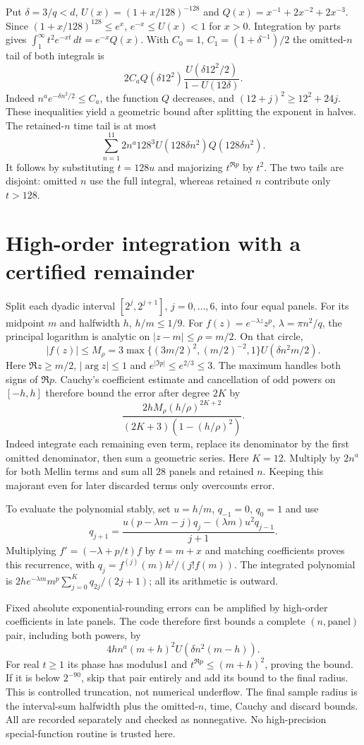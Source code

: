 Put $\delta=3/q<d$, $U(x)=(1+x/128)^{-128}$ and
$Q(x)=x^{-1}+2x^{-2}+2x^{-3}$. Since $(1+x/128)^{128}\le e^x$,
$e^{-x}\le U(x)<1$ for $x>0$. Integration by parts gives
$\int_1^\infty t^2e^{-xt}\,dt=e^{-x}Q(x)$.
With $C_0=1$, $C_1=(1+\delta^{-1})/2$ the omitted-$n$ tail of both integrals is
\[
 2C_aQ(\delta12^2)
 \frac{U(\delta12^2/2)}{1-U(12\delta)}.
\]
Indeed $n^ae^{-\delta n^2/2}\le C_a$, the function $Q$ decreases, and
$(12+j)^2\ge12^2+24j$. These inequalities yield a geometric bound after
splitting the exponent in halves. The retained-$n$ time tail is at most
\[
 \sum_{n=1}^{11}2n^a128^3U(128\delta n^2)Q(128\delta n^2).
\]
It follows by substituting $t=128u$ and majorizing $t^{\Re p}$ by $t^2$.
The two tails are disjoint: omitted $n$ use the full integral, whereas
retained $n$ contribute only $t>128$.

\section{High-order integration with a certified remainder}
Split each dyadic interval $[2^j,2^{j+1}]$, $j=0,\ldots,6$, into four equal
panels. For its midpoint $m$ and halfwidth $h$, $h/m\le1/9$.
For $f(z)=e^{-\lambda z}z^p$, $\lambda=\pi n^2/q$, the principal logarithm
is analytic on $|z-m|\le\rho=m/2$. On that circle,
\[
 |f(z)|\le M_\rho=3\max\{(3m/2)^2,(m/2)^{-2},1\}
 U(\delta n^2m/2).
\]
Here $\Re z\ge m/2$, $|\arg z|\le1$ and
$e^{|\Im p|}\le e^{2/3}\le3$. The maximum handles both signs of $\Re p$.
Cauchy's coefficient estimate and cancellation of odd powers on $[-h,h]$
therefore bound the error after degree $2K$ by
\[
 \frac{2hM_\rho(h/\rho)^{2K+2}}
 {(2K+3)(1-(h/\rho)^2)}.
\]
Indeed integrate each remaining even term, replace its denominator by the
first omitted denominator, then sum a geometric series. Here $K=12$.
Multiply by $2n^a$ for both Mellin terms and sum all $28$ panels and retained $n$.
Keeping this majorant even for later discarded terms only overcounts error.

To evaluate the polynomial stably, set $u=h/m$, $q_{-1}=0$, $q_0=1$ and use
\[
 q_{j+1}=\frac{u(p-\lambda m-j)q_j-(\lambda m)u^2q_{j-1}}{j+1}.
\]
Multiplying $f'=(-\lambda+p/t)f$ by $t=m+x$ and matching coefficients proves
this recurrence, with $q_j=f^{(j)}(m)h^j/(j!f(m))$. The integrated polynomial is
$2he^{-\lambda m}m^p\sum_{j=0}^{K}q_{2j}/(2j+1)$; all its arithmetic is outward.

Fixed absolute exponential-rounding errors can be amplified by high-order
coefficients in late panels. The code therefore first bounds a complete
$(n,\text{panel})$ pair, including both powers, by
\[
 4hn^a(m+h)^2U(\delta n^2(m-h)).
\]
For real $t\ge1$ its phase has modulus1 and $t^{\Re p}\le(m+h)^2$, proving
the bound. If it is below $2^{-90}$, skip that pair entirely and add its bound
to the final radius. This is controlled truncation, not numerical underflow.
The final sample radius is the interval-sum halfwidth plus the omitted-$n$,
time, Cauchy and discard bounds. All are recorded separately and checked as
nonnegative. No high-precision special-function routine is trusted here.

